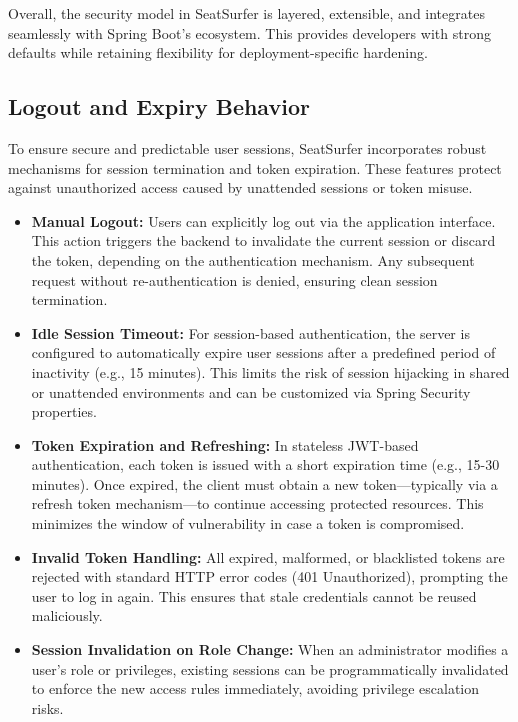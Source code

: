 \documentclass[12pt,a4paper]{report} %
\begin{document}
Overall, the security model in SeatSurfer is layered, extensible, and integrates seamlessly with Spring Boot's ecosystem. This provides developers with strong defaults while retaining flexibility for deployment-specific hardening.

\subsection{Logout and Expiry Behavior}

To ensure secure and predictable user sessions, SeatSurfer incorporates robust mechanisms for session termination and token expiration. These features protect against unauthorized access caused by unattended sessions or token misuse.

\begin{itemize}
\item \textbf{Manual Logout:}
Users can explicitly log out via the application interface. This action triggers the backend to invalidate the current session or discard the token, depending on the authentication mechanism. Any subsequent request without re-authentication is denied, ensuring clean session termination.
\item \textbf{Idle Session Timeout:}  
For session-based authentication, the server is configured to automatically expire user sessions after a predefined period of inactivity (e.g., 15 minutes). This limits the risk of session hijacking in shared or unattended environments and can be customized via Spring Security properties.

\item \textbf{Token Expiration and Refreshing:}  
In stateless JWT-based authentication, each token is issued with a short expiration time (e.g., 15-30 minutes). Once expired, the client must obtain a new token—typically via a refresh token mechanism—to continue accessing protected resources. This minimizes the window of vulnerability in case a token is compromised.

\item \textbf{Invalid Token Handling:}  
All expired, malformed, or blacklisted tokens are rejected with standard HTTP error codes (401 Unauthorized), prompting the user to log in again. This ensures that stale credentials cannot be reused maliciously.

\item \textbf{Session Invalidation on Role Change:}  
When an administrator modifies a user’s role or privileges, existing sessions can be programmatically invalidated to enforce the new access rules immediately, avoiding privilege escalation risks.
\end{itemize}
\end{document}
